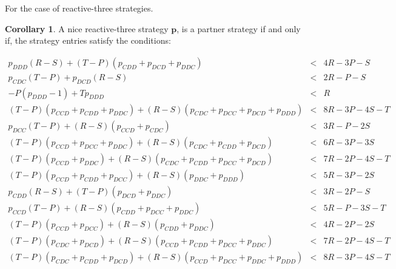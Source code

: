 \documentclass{article}
\theoremstyle{definition}
\newtheorem{corollary}{Corollary}[theorem]
\begin{document}
For the case of reactive-three strategies.

\begin{corollary}\label{corollary:reactive_three_partner_strategies_PD}
A nice reactive-three strategy $\mathbf{p}$, is a partner strategy if and only if,
the strategy entries satisfy the conditions:

\begin{equation*}
  \begin{array}{ccc}
    p_{DDD} \left(R - S\right) + \left(T - P\right) \left(p_{CDD} + p_{DCD} + p_{DDC}\right) & < & 4 R - 3 P  - S \\ [0.2cm]
    p_{CDC} \left(T - P\right) + p_{DCD} \left(R - S\right) & < & 2 R - P  - S \\ [0.2cm]
    - P \left(p_{DDD} - 1\right) + T p_{DDD} & < & R \\ [0.2cm] 
    \left(T - P\right) \left(p_{CCD} + p_{CDD} + p_{DDC}\right) + \left(R - S\right) \left(p_{CDC} + p_{DCC} + p_{DCD} + p_{DDD}\right) & < & 8 R - 3 P - 4 S - T \\ [0.2cm]
    p_{DCC} \left(T - P\right) + \left(R - S\right) \left(p_{CCD} + p_{CDC}\right) & < & 3 R - P - 2 S \\ [0.2cm]
    \left(T - P\right) \left(p_{CCD} + p_{DCC} + p_{DDC}\right) + \left(R - S\right) \left(p_{CDC} + p_{CDD} + p_{DCD}\right) & < & 6 R - 3 P - 3 S \\ [0.2cm]
    \left(T - P\right) \left(p_{CCD} + p_{DDC}\right) + \left(R - S\right) \left(p_{CDC} + p_{CDD} + p_{DCC} + p_{DCD}\right) & < & 7 R - 2 P - 4 S - T \\ [0.2cm]
    \left(T - P\right) \left(p_{CCD} + p_{CDD} + p_{DCC}\right) + \left(R - S\right) \left(p_{DDC} + p_{DDD}\right) & < & 5 R - 3 P - 2 S \\ [0.2cm]
    p_{CDD} \left(R - S\right) + \left(T - P\right) \left(p_{DCD} + p_{DDC}\right) & < & 3 R - 2 P - S \\ [0.2cm] 
    p_{CCD} \left(T - P\right) + \left(R - S\right) \left(p_{CDD} + p_{DCC} + p_{DDC}\right) & < & 5 R - P - 3 S - T \\ [0.2cm]
    \left(T - P\right) \left(p_{CCD} + p_{DCC}\right) + \left(R - S\right) \left(p_{CDD} + p_{DDC}\right) & < & 4 R - 2 P - 2 S \\ [0.2cm]
    \left(T - P\right) \left(p_{CDC} + p_{DCD}\right) + \left(R - S\right) \left(p_{CCD} + p_{CDD} + p_{DCC} + p_{DDC}\right) & < & 7 R - 2 P - 4 S - T \\ [0.2cm]
    \left(T - P\right) \left(p_{CDC} + p_{CDD} + p_{DCD}\right) + \left(R - S\right) \left(p_{CCD} + p_{DCC} + p_{DDC} + p_{DDD}\right) & < & 8 R - 3 P - 4 S - T \\ [0.2cm]

\end{array}
\end{equation*}
\end{corollary}
\end{document}
